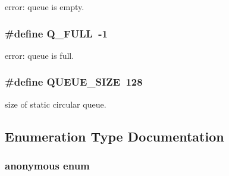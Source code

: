 error: queue is empty.

\subsubsection{\setlength{\rightskip}{0pt plus 5cm}\#define Q\_\-FULL\ -1}\label{P__defs_8h_a32}


error: queue is full.

\subsubsection{\setlength{\rightskip}{0pt plus 5cm}\#define QUEUE\_\-SIZE\ 128}\label{P__defs_8h_a31}


size of static circular queue.



\subsection{Enumeration Type Documentation}
\subsubsection{\setlength{\rightskip}{0pt plus 5cm}anonymous enum}\label{P__defs_8h_a56}


